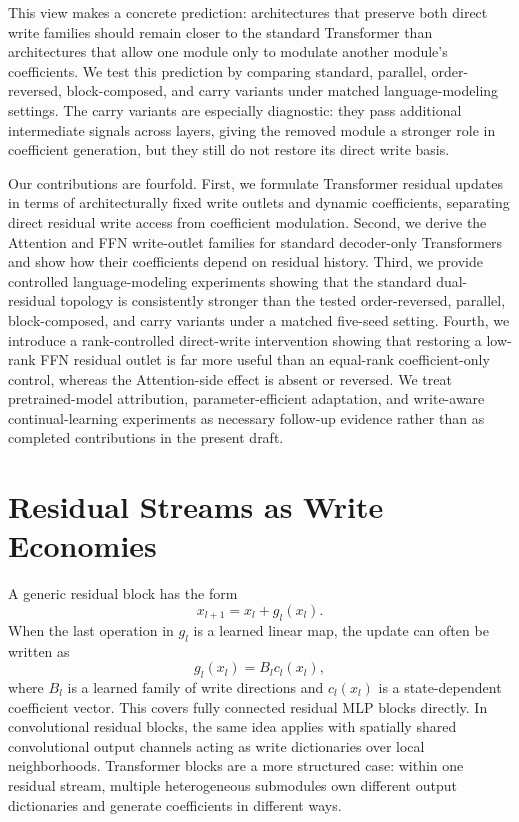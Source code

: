 \documentclass[letterpaper]{article}
\begin{document}
This view makes a concrete prediction: architectures that preserve both direct
write families should remain closer to the standard Transformer than
architectures that allow one module only to modulate another module's
coefficients. We test this prediction by comparing standard, parallel,
order-reversed, block-composed, and carry variants under matched
language-modeling settings. The carry variants are especially diagnostic: they
pass additional intermediate signals across layers, giving the removed module a
stronger role in coefficient generation, but they still do not restore its
direct write basis.

Our contributions are fourfold. First, we formulate Transformer residual
updates in terms of architecturally fixed write outlets and dynamic
coefficients, separating direct residual write access from coefficient
modulation. Second, we derive the Attention and FFN write-outlet families for
standard decoder-only Transformers and show how their coefficients depend on
residual history. Third, we provide controlled language-modeling experiments
showing that the standard dual-residual topology is consistently stronger than
the tested order-reversed, parallel, block-composed, and carry variants under a
matched five-seed setting. Fourth, we introduce a rank-controlled direct-write
intervention showing that restoring a low-rank FFN residual outlet is far more
useful than an equal-rank coefficient-only control, whereas the Attention-side
effect is absent or reversed. We treat pretrained-model attribution,
parameter-efficient adaptation, and write-aware continual-learning experiments
as necessary follow-up evidence rather than as completed contributions in the
present draft.

\section{Residual Streams as Write Economies}

A generic residual block has the form
\begin{equation}
x_{l+1}=x_l+g_l(x_l).
\end{equation}
When the last operation in $g_l$ is a learned linear map, the update can often
be written as
\begin{equation}
g_l(x_l)=B_l c_l(x_l),
\label{eq:generic-write}
\end{equation}
where $B_l$ is a learned family of write directions and $c_l(x_l)$ is a
state-dependent coefficient vector. This covers fully connected residual MLP
blocks directly. In convolutional residual blocks, the same idea applies with
spatially shared convolutional output channels acting as write dictionaries
over local neighborhoods. Transformer blocks are a more structured case: within
one residual stream, multiple heterogeneous submodules own different output
dictionaries and generate coefficients in different ways.
\end{document}
